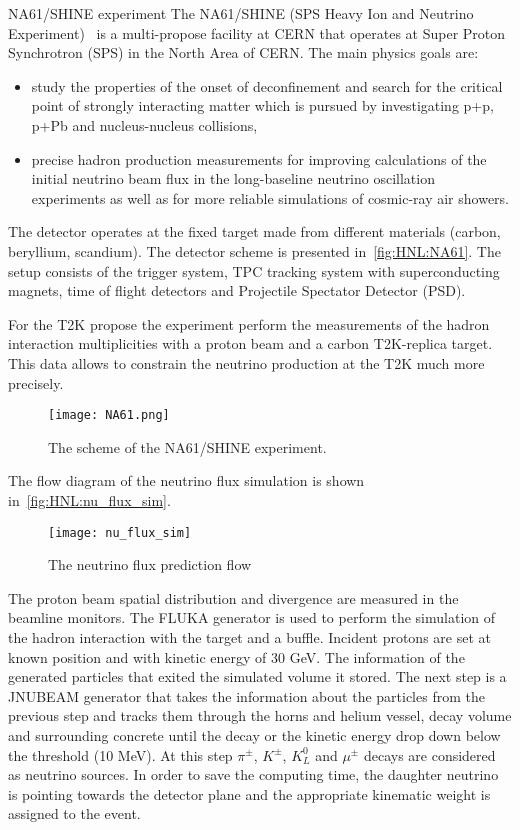 \documentclass[../main.tex]{subfiles}
\begin{document}
\begin{bclogo}[couleur=blue!2, arrondi=0.1, logo=\bcinfo, nobreak=true]{NA61/SHINE experiment}
The NA61/SHINE (SPS Heavy Ion and Neutrino Experiment)~\cite{Abgrall2014} is a multi-propose facility at CERN that operates at Super Proton Synchrotron (SPS) in the North Area of CERN. The main physics goals are:
\begin{itemize}
    \item study the properties of the onset of deconfinement and search for the critical point of strongly interacting matter which is pursued by investigating p+p, p+Pb and nucleus-nucleus collisions,
    \item precise hadron production measurements for improving calculations of the initial neutrino beam flux in the long-baseline neutrino oscillation experiments as well as for more reliable simulations of cosmic-ray air showers.
\end{itemize}
The detector operates at the fixed target made from different materials (carbon, beryllium, scandium). The detector scheme is presented in~\autoref{fig:HNL:NA61}. The setup consists of the trigger system, TPC tracking system with superconducting magnets, time of flight detectors and Projectile Spectator Detector (PSD).

For the T2K propose the experiment perform the measurements of the hadron interaction multiplicities with a proton beam and a carbon T2K-replica target. This data allows to constrain the neutrino production at the T2K much more precisely.
\end{bclogo}

\begin{figure}[!ht]
    \centering
    \texttt{[image: NA61.png]}
    \caption{The scheme of the NA61/SHINE experiment.}
    \label{fig:HNL:NA61}
\end{figure}

The flow diagram of the neutrino flux simulation is shown in~\autoref{fig:HNL:nu_flux_sim}.

\begin{figure}[!ht]
    \centering
    \texttt{[image: nu\_flux\_sim]}
    \caption{The neutrino flux prediction flow}
    \label{fig:HNL:nu_flux_sim}
\end{figure}

The proton beam spatial distribution and divergence are measured in the beamline monitors. The FLUKA generator is used to perform the simulation of the hadron interaction with the target and a buffle. Incident protons are set at known position and with kinetic energy of 30 GeV. The information of the generated particles that exited the simulated volume it stored. The next step is a JNUBEAM generator that takes the information about the particles from the previous step and tracks them through the horns and helium vessel, decay volume and surrounding concrete until the decay or the kinetic energy drop down below the threshold (10 MeV). At this step $\pi^\pm$, $K^\pm$, $K_L^0$ and $\mu^\pm$ decays are considered as neutrino sources. In order to save the computing time, the daughter neutrino is pointing towards the detector plane and the appropriate kinematic weight is assigned to the event.
\end{document}

